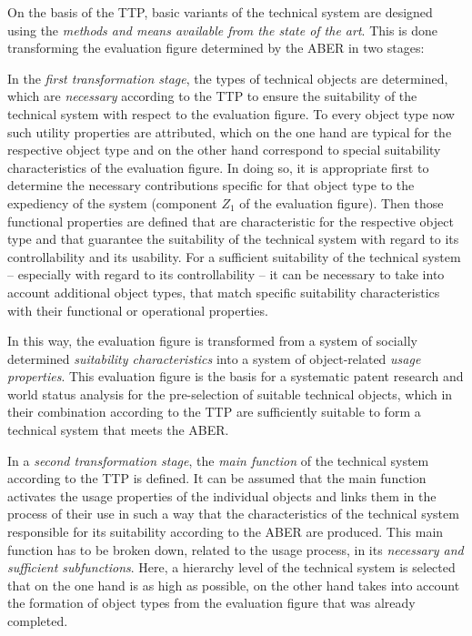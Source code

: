 \documentclass[11pt,a4paper]{article}
\begin{document}
On the basis of the TTP, basic variants of the technical system are designed
using the \emph{methods and means available from the state of the art}.  This
is done transforming the evaluation figure determined by the ABER in two
stages:

In the \emph{first transformation stage}, the types of technical objects are
determined, which are \emph{necessary} according to the TTP to ensure the
suitability of the technical system with respect to the evaluation figure.  To
every object type now such utility properties are attributed, which on the one
hand are typical for the respective object type and on the other hand
correspond to special suitability characteristics of the evaluation figure. In
doing so, it is appropriate first to determine the necessary contributions
specific for that object type to the expediency of the system (component $Z_1$
of the evaluation figure). Then those functional properties are defined that
are characteristic for the respective object type and that guarantee the
suitability of the technical system with regard to its controllability and its
usability. For a sufficient suitability of the technical system -- especially
with regard to its controllability -- it can be necessary to take into account
additional object types, that match specific suitability characteristics with
their functional or operational properties.

In this way, the evaluation figure is transformed from a system of socially
determined \emph{suitability characteristics} into a system of object-related
\emph{usage properties}. This evaluation figure is the basis for a systematic
patent research and world status analysis for the pre-selection of suitable
technical objects, which in their combination according to the TTP are
sufficiently suitable to form a technical system that meets the ABER.

In a \emph{second transformation stage}, the \emph{main function} of the
technical system according to the TTP is defined. It can be assumed that the
main function activates the usage properties of the individual objects and
links them in the process of their use in such a way that the characteristics
of the technical system responsible for its suitability according to the ABER
are produced.  This main function has to be broken down, related to the usage
process, in its \emph{necessary and sufficient subfunctions}. Here, a
hierarchy level of the technical system is selected that on the one hand is as
high as possible, on the other hand takes into account the formation of object
types from the evaluation figure that was already completed.
\end{document}
